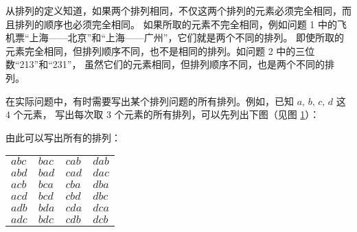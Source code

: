 从排列的定义知道，如果两个排列相同，不仅这两个排列的元素必须完全相同，而且排列的顺序也必须完全相同。
如果所取的元素不完全相同，例如问题 1 中的飞机票“上海——北京”和“上海——广州”，它们就是两个不同的排列。
即使所取的元素完全相同，但排列顺序不同，也不是相同的排列。如问题 2 中的三位数“213”和“231”，
虽然它们的元素相同，但排列顺序不同，也是两个不同的排列。

在实际问题中，有时需要写出某个排列问题的所有排列。例如，已知 $a,\, b,\, c,\, d$ 这 $4$ 个元素，
写出每次取 $3$ 个元素的所有排列，可以先列出下图（见图 \ref{fig:2-2}）：

\begin{figure}[htbp]
    \centering
    
    \caption{}\label{fig:2-2}
\end{figure}

由此可以写出所有的排列：
\begin{table}[H]
    \centering
    \begin{tabular}{*{4}{w{c}{3em}}}
        $abc$ & $bac$ & $cab$ & $dab$ \\
        $abd$ & $bad$ & $cad$ & $dac$ \\
        $acb$ & $bca$ & $cba$ & $dba$ \\
        $acd$ & $bcd$ & $cbd$ & $dbc$ \\
        $adb$ & $bda$ & $cda$ & $dca$ \\
        $adc$ & $bdc$ & $cdb$ & $dcb$
    \end{tabular}
\end{table}




